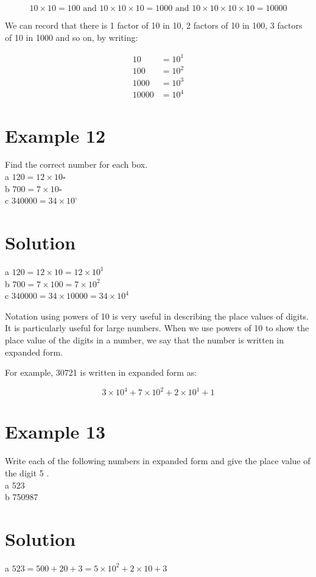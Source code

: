 \documentclass[10pt]{article}
\begin{document}
\[
10 \times 10=100 \text { and } 10 \times 10 \times 10=1000 \text { and } 10 \times 10 \times 10 \times 10=10000
\]

We can record that there is 1 factor of 10 in 10, 2 factors of 10 in 100, 3 factors of 10 in 1000 and so on, by writing:

\[
\begin{aligned}
10 & =10^{1} \\
100 & =10^{2} \\
1000 & =10^{3} \\
10000 & =10^{4}
\end{aligned}
\]

\section*{Example 12}
Find the correct number for each box.\\
a \(120=12 \times 10 \square\)\\
b \(700=7 \times 10 \square\)\\
c \(340000=34 \times 10^{\square}\)

\section*{Solution}
a \(120=12 \times 10=12 \times 10^{1}\)\\
b \(700=7 \times 100=7 \times 10^{2}\)\\
c \(340000=34 \times 10000=34 \times 10^{4}\)

Notation using powers of 10 is very useful in describing the place values of digits. It is particularly useful for large numbers. When we use powers of 10 to show the place value of the digits in a number, we say that the number is written in expanded form.

For example, 30721 is written in expanded form as:

\[
3 \times 10^{4}+7 \times 10^{2}+2 \times 10^{1}+1
\]

\section*{Example 13}
Write each of the following numbers in expanded form and give the place value of the digit 5 .\\
a 523\\
b 750987

\section*{Solution}
a \(523=500+20+3=5 \times 10^{2}+2 \times 10+3\)
\end{document}
